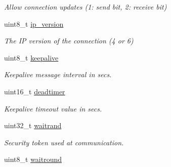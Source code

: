 \begin{DoxyCompactItemize}
\begin{DoxyCompactList}\small\item\em Allow connection updates (1\-: send bit, 2\-: receive bit) \end{DoxyCompactList}\item 
\hypertarget{structconnection__struct_a8d5dab544aa6ca6d812e1676857b7545}{uint8\-\_\-t \hyperlink{structconnection__struct_a8d5dab544aa6ca6d812e1676857b7545}{ip\-\_\-version}}\label{structconnection__struct_a8d5dab544aa6ca6d812e1676857b7545}

\begin{DoxyCompactList}\small\item\em The I\-P version of the connection (4 or 6) \end{DoxyCompactList}\item 
\hypertarget{structconnection__struct_aba0b971f0932db8772a9091c0da49728}{uint8\-\_\-t \hyperlink{structconnection__struct_aba0b971f0932db8772a9091c0da49728}{keepalive}}\label{structconnection__struct_aba0b971f0932db8772a9091c0da49728}

\begin{DoxyCompactList}\small\item\em Keepalive message interval in secs. \end{DoxyCompactList}\item 
\hypertarget{structconnection__struct_a4eabad362f93734f4f6e13b9bb274da7}{uint16\-\_\-t \hyperlink{structconnection__struct_a4eabad362f93734f4f6e13b9bb274da7}{deadtimer}}\label{structconnection__struct_a4eabad362f93734f4f6e13b9bb274da7}

\begin{DoxyCompactList}\small\item\em Keepalive timeout value in secs. \end{DoxyCompactList}\item 
\hypertarget{structconnection__struct_af2dabb18b8b659720278110a2d7f9c27}{uint32\-\_\-t \hyperlink{structconnection__struct_af2dabb18b8b659720278110a2d7f9c27}{waitrand}}\label{structconnection__struct_af2dabb18b8b659720278110a2d7f9c27}

\begin{DoxyCompactList}\small\item\em Security token used at communication. \end{DoxyCompactList}\item 
\hypertarget{structconnection__struct_a8cc967f1cdeb0aba354ec49ae70d4795}{uint8\-\_\-t \hyperlink{structconnection__struct_a8cc967f1cdeb0aba354ec49ae70d4795}{waitround}}\label{structconnection__struct_a8cc967f1cdeb0aba354ec49ae70d4795}


\end{DoxyCompactItemize}
